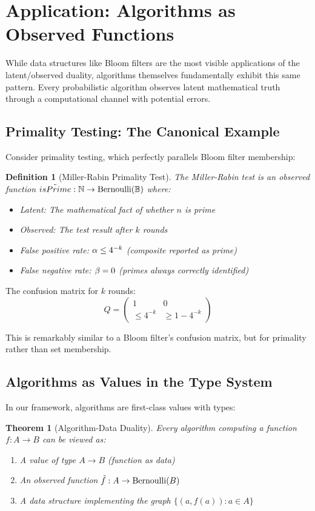 \documentclass[11pt]{article}
\newtheorem{definition}{Definition}
\newtheorem{theorem}{Theorem}
\begin{document}
\section{Application: Algorithms as Observed Functions}

While data structures like Bloom filters are the most visible applications of the latent/observed duality, algorithms themselves fundamentally exhibit this same pattern. Every probabilistic algorithm observes latent mathematical truth through a computational channel with potential errors.

\subsection{Primality Testing: The Canonical Example}

Consider primality testing, which perfectly parallels Bloom filter membership:

\begin{definition}[Miller-Rabin Primality Test]
The Miller-Rabin test is an observed function $\tilde{isPrime}: \mathbb{N} \to \text{Bernoulli}(\mathbb{B})$ where:
\begin{itemize}
\item Latent: The mathematical fact of whether $n$ is prime
\item Observed: The test result after $k$ rounds
\item False positive rate: $\alpha \leq 4^{-k}$ (composite reported as prime)
\item False negative rate: $\beta = 0$ (primes always correctly identified)
\end{itemize}
\end{definition}

The confusion matrix for $k$ rounds:
$$Q = \begin{pmatrix}
1 & 0 \\
\leq 4^{-k} & \geq 1-4^{-k}
\end{pmatrix}$$

This is remarkably similar to a Bloom filter's confusion matrix, but for primality rather than set membership.

\subsection{Algorithms as Values in the Type System}

In our framework, algorithms are first-class values with types:

\begin{theorem}[Algorithm-Data Duality]
Every algorithm computing a function $f: A \to B$ can be viewed as:
\begin{enumerate}
\item A value of type $A \to B$ (function as data)
\item An observed function $\tilde{f}: A \to \text{Bernoulli}(B)$
\item A data structure implementing the graph $\{(a, f(a)) : a \in A\}$
\end{enumerate}
\end{theorem}
\end{document}
